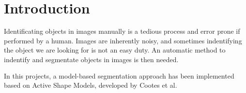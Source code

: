 \section{Introduction}
Identificating objects in images manually is a tedious process and
error prone if performed by a human. Images are inherently noisy, and
sometimes indentifying the object we are looking for is not an easy duty.
An automatic method to indentify and segmentate objects in images
is then needed.

In this projects, a model-based segmentation approach has been
implemented based on Active Shape Models, developed by Cootes et al.